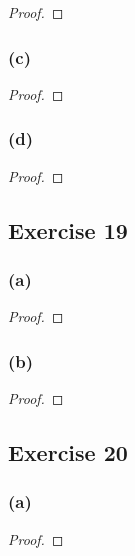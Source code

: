 \documentclass[14pt]{extarticle}
\begin{document}
\begin{proof}

\end{proof}

\subsubsection{(c)}

\begin{proof}

\end{proof}

\subsubsection{(d)}

\begin{proof}

\end{proof}

\subsection{Exercise 19}

\subsubsection{(a)}

\begin{proof}

\end{proof}

\subsubsection{(b)}

\begin{proof}

\end{proof}

\subsection{Exercise 20}

\subsubsection{(a)}

\begin{proof}

\end{proof}
\end{document}
